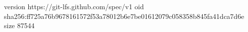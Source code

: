 version https://git-lfs.github.com/spec/v1
oid sha256:ff725a76b9678161572f53a78012b6e7be01612079c058358b845fa41dca7d6e
size 87544
